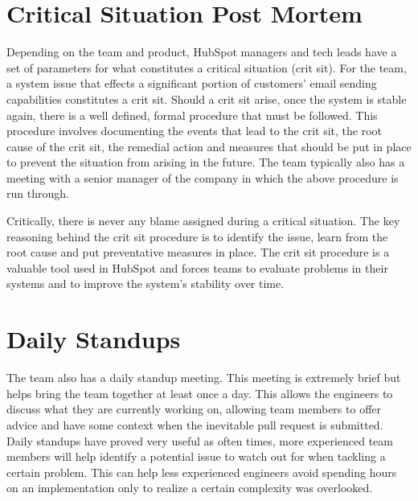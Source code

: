 \section{Critical Situation Post Mortem}
Depending on the team and product, HubSpot managers and tech leads have a set of parameters for what constitutes a critical situation (crit sit). For the \team{} team, a system issue that effects a significant portion of customers' email sending capabilities constitutes a crit sit. Should a crit sit arise, once the system is stable again, there is a well defined, formal procedure that must be followed. This procedure involves documenting the events that lead to the crit sit, the root cause of the crit sit, the remedial action and measures that should be put in place to prevent the situation from arising in the future. The team typically also has a meeting with a senior manager of the company in which the above procedure is run through.

Critically, there is never any blame assigned during a critical situation. The key reasoning behind the crit sit procedure is to identify the issue, learn from the root cause and put preventative measures in place. The crit sit procedure is a valuable tool used in HubSpot and forces teams to evaluate problems in their systems and to improve the system's stability over time.

\section{Daily Standups}
The \team{} team also has a daily standup meeting. This meeting is extremely brief but helps bring the team together at least once a day. This allows the engineers to discuss what they are currently working on, allowing team members to offer advice and have some context when the inevitable pull request is submitted. Daily standups have proved very useful as often times, more experienced team members will help identify a potential issue to watch out for when tackling a certain problem. This can help less experienced engineers avoid spending hours on an implementation only to realize a certain complexity was overlooked. 
